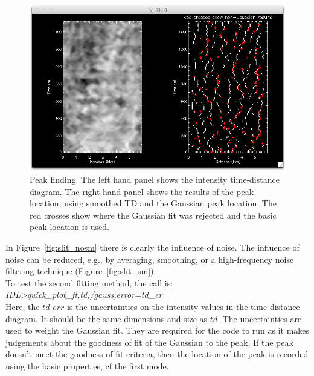 \documentclass{article}
\begin{document}
\begin{figure}[!tp]
\centering

\includegraphics[scale=0.6, clip=true, viewport=0.5cm 0.cm 25.cm 16.7cm]{slit_gauss.png}  

\caption{Peak finding. The left hand panel shows the intensity time-distance diagram. The right hand panel shows the results of the peak location, using smoothed TD and the Gaussian peak location. The red crosses show where the Gaussian fit was rejected and the basic peak location is used.
}\label{fig:slit_g}
\end{figure}

In Figure~\ref{fig:slit_nosm} there is clearly the influence of noise. The influence of noise can be reduced, e.g., by averaging, smoothing, or a high-frequency noise filtering 
technique (Figure~\ref{fig:slit_sm}). \\

To test the second fitting method, the call is: \\

\textit{IDL\textgreater quick\_plot\_ft,td,/gauss,error=td\_er} \\

Here, the $td\_err$ is the uncertainties on the intensity values in the time-distance diagram. It should be the same dimensions and size as $td$. The uncertainties are used 
to weight the Gaussian fit. They are required for the code to run as it makes judgements about the goodness of fit of the Gaussian to the peak. If the peak doesn't meet the 
goodness of fit criteria, then the location of the peak is recorded using the basic properties, cf the first mode.\\
\end{document}
